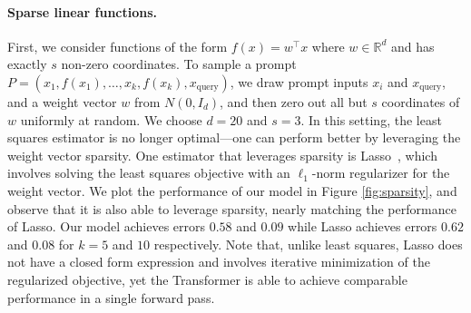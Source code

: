 \documentclass{article}
\begin{document}
\paragraph{Sparse linear functions.}
First, we consider functions of the form $f(x) = w^\top x$ where $w \in \mathbb{R}^d$ and has exactly $s$ non-zero coordinates.
To sample a prompt $P = (x_1, f(x_1), \ldots, x_k,f(x_k), x_\text{query})$, we draw prompt inputs $x_i$ and $x_\text{query}$, and a weight vector $w$ from $N(0, I_d)$, and then zero out all but $s$ coordinates of $w$ uniformly at random. 
We choose $d = 20$ and $s = 3$.
In this setting, the least squares estimator is no longer optimal---one can perform better by leveraging the weight vector sparsity. 
One estimator that leverages sparsity is Lasso~\citep{tibshirani1996regression}, which involves solving the least squares objective with an $\ell_1$-norm regularizer for the weight vector.
We plot the performance of our model in Figure \ref{fig:sparsity}, and observe that it is also able to leverage sparsity, nearly matching the performance of Lasso. Our model achieves errors $0.58$ and $0.09$ while Lasso achieves errors $0.62$ and $0.08$ for $k = 5$ and $10$ respectively. Note that, unlike least squares, Lasso does not have a closed form expression and involves iterative minimization of the regularized objective, yet the Transformer is able to achieve comparable performance in a single forward pass.
\end{document}
